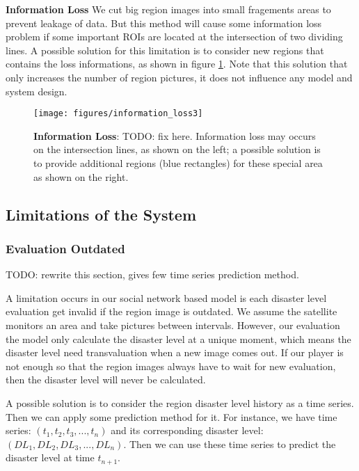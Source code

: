\textbf{Information Loss}
We cut big region images into small fragements areas to prevent leakage of data. 
But this method will cause some information loss problem if some important ROIs are 
located at the intersection of two dividing lines.
A possible solution for this limitation is to consider new regions that contains the loss
informations, as shown in figure \ref{fig:information_loss}. Note that this solution that
only increases the number of region pictures, it does not influence any model and system design.


\begin{figure}[H]
\centering
\texttt{[image: figures/information\_loss3]}
\caption{\textbf{Information Loss}: TODO: fix here. Information loss may occurs on the intersection lines, as shown on the left; a possible solution
is to provide additional regions (blue rectangles) for these special area as shown on the right.}
\label{fig:information_loss}
\end{figure}

\subsection{Limitations of the System}

\subsubsection{Evaluation Outdated}

TODO: rewrite this section, gives few time series prediction method.

A limitation occurs in our social network based model is each disaster level evaluation get invalid 
if the region image is outdated. 
We assume the satellite monitors an area and take pictures between intervals. However, our evaluation
the model only calculate the disaster level at a unique moment, which means the disaster level need 
transvaluation when a new image comes out.
If our player is not enough so that the region images always have to wait for new evaluation, then the
disaster level will never be calculated.

A possible solution is to consider the region disaster level history as a time series. Then we can apply
some prediction method for it. For instance, we have time series: $(t_1, t_2, t_3, ..., t_n)$
and its corresponding disaster level: $(DL_1, DL_2, DL_3, ..., DL_n)$.
Then we can use these time series to predict the disaster level at time $t_{n+1}$.

